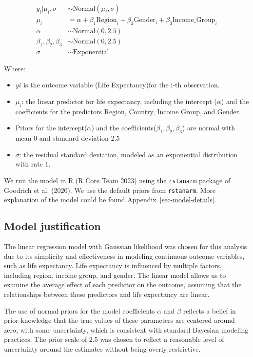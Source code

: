 \documentclass[
  letterpaper,
  DIV=11,
  numbers=noendperiod]{scrartcl}
\begin{document}
\begin{align*} 
y_i|\mu_i, \sigma &\sim \text{Normal}(\mu_i, \sigma) \\
\mu_i &= \alpha + \beta_1 \text{Region}_i + \beta_2 \text{Gender}_i + \beta_3 \text{Income\_Group}_i \\
\alpha &\sim \text{Normal}(0, 2.5) \\
\beta_1, \beta_2, \beta_3 &\sim \text{Normal}(0, 2.5) \\
\sigma &\sim \text{Exponential}
\end{align*}

Where:

\begin{itemize}
\item
  \(yi\) is the outcome variable (Life Expectancy)for the i-th
  observation.
\item
  \(\mu_i\): the linear predictor for life expectancy, including the
  intercept (\(\alpha\)) and the coefficients for the predictors Region,
  Country, Income Group, and Gender.
\item
  Priors for the intercept(\(\alpha\)) and the
  coefficients(\(\beta_1, \beta_2, \beta_3\)) are normal with mean 0 and
  standard deviation 2.5
\item
  \(\sigma\): the residual standard deviation, modeled as an exponential
  distribution with rate 1.
\end{itemize}

We run the model in R (R Core Team 2023) using the \texttt{rstanarm}
package of Goodrich et al. (2020). We use the default priors from
\texttt{rstanarm}. More explanation of the model could be found
Appendix~\ref{sec-model-details}.

\subsection{Model justification}\label{sec-modjust}

The linear regression model with Gaussian likelihood was chosen for this
analysis due to its simplicity and effectiveness in modeling continuous
outcome variables, such as life expectancy. Life expectancy is
influenced by multiple factors, including region, income group, and
gender. The linear model allows us to examine the average effect of each
predictor on the outcome, assuming that the relationships between these
predictors and life expectancy are linear.

The use of normal priors for the model coefficients \(\alpha\) and
\(\beta\) reflects a belief in prior knowledge that the true values of
these parameters are centered around zero, with some uncertainty, which
is consistent with standard Bayesian modeling practices. The prior scale
of 2.5 was chosen to reflect a reasonable level of uncertainty around
the estimates without being overly restrictive.
\end{document}
